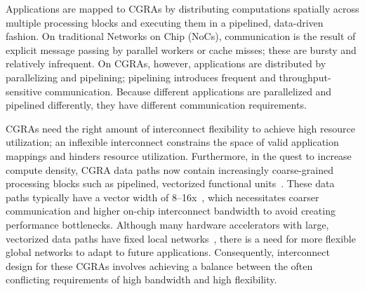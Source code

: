 Applications are mapped to CGRAs by distributing computations spatially across multiple processing blocks and executing them in a pipelined, data-driven fashion.
On traditional Networks on Chip (NoCs), communication is the result of explicit message passing by parallel workers or cache misses; these are bursty and relatively infrequent.
On CGRAs, however, applications are distributed by parallelizing and pipelining; pipelining introduces frequent and throughput-sensitive communication.
Because different applications are parallelized and pipelined differently, they have different communication requirements.

CGRAs need the right amount of interconnect flexibility to achieve high resource utilization; an inflexible interconnect constrains the space of
valid application mappings and hinders resource utilization. Furthermore, in the quest to increase compute density, CGRA data paths now 
contain increasingly coarse-grained processing blocks such as pipelined, vectorized functional units~\cite{plasticine, piperench, xilinx-acap}.
These data paths typically have a vector width of 8--16x~\cite{plasticine}, which necessitates coarser communication and higher on-chip interconnect bandwidth to avoid
creating performance bottlenecks. 
Although many hardware accelerators with large, vectorized data paths have fixed local networks~\cite{brainwave}, there is a need for more
flexible global networks to adapt to future applications.
Consequently, interconnect design for these CGRAs involves achieving a balance between the often conflicting requirements of high bandwidth and high flexibility.

